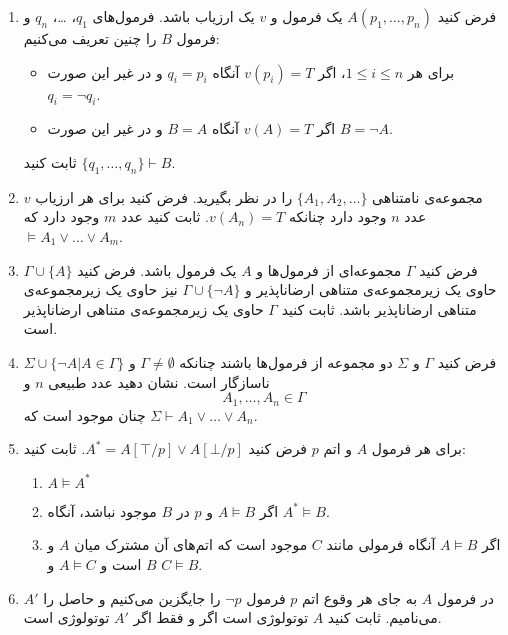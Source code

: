 \documentclass[12pt, 14paper]{article}
\begin{document}
\begin{enumerate}
\item
فرض کنید
$A(p_1,\ldots,p_n)$
یک فرمول و $v$ یک ارزیاب باشد. فرمول‌های $q_1$، \ldots، $q_n$ و فرمول $B$ را چنین تعریف می‌کنیم:
\begin{itemize}[label={--}]
\item
برای هر $1\leq i\leq n$، اگر $v(p_i)=T$ آنگاه $q_i=p_i$ و در غیر این صورت $q_i=\neg q_i$.

\item
اگر $v(A)=T$ آنگاه $B=A$ و در غیر این صورت $B=\neg A$.
\end{itemize}
ثابت کنید
$\{q_1,\ldots,q_n\}\vdash B$.

\item
مجموعه‌ی نامتناهی
$\{A_1,A_2,\ldots\}$
را در نظر بگیرید. فرض کنید برای هر ارزیاب $v$ عدد $n$ وجود دارد چنانکه $v(A_n)=T$. ثابت کنید عدد $m$ وجود دارد که
$\models A_1\vee\ldots\vee A_m$.

\item
فرض کنید $\Gamma$ مجموعه‌ای از فرمول‌ها و $A$ یک فرمول باشد. فرض کنید $\Gamma\cup \{A\}$ حاوی یک زیرمجموعه‌ی متناهی ارضاناپذیر و $\Gamma\cup\{\neg A\}$ نیز حاوی یک زیرمجموعه‌ی متناهی ارضاناپذیر باشد. ثابت کنید $\Gamma$ حاوی یک زیرمجموعه‌ی متناهی ارضاناپذیر است.

\item
فرض کنید $\Gamma$ و $\Sigma$ دو مجموعه از فرمول‌ها باشند چنانکه $\Gamma\neq\emptyset$ و
$\Sigma\cup\{\neg A|A\in\Gamma\}$
ناسازگار است. نشان دهید عدد طبیعی $n$ و
$$
A_1,\ldots,A_n\in\Gamma
$$
چنان موجود است که
$\Sigma\vdash A_1\vee\ldots\vee A_n$.

\item
برای هر فرمول $A$ و اتم $p$ فرض کنید
$A^*=A[\top/p]\vee A[\bot/p]$.
ثابت کنید:
\begin{enumerate}
\item
$A\models A^*$
\item
اگر
$A\models B$
و $p$ در $B$ موجود نباشد، آنگاه
$A^*\models B$.
\item
اگر
$A\models B$
آنگاه فرمولی مانند $C$ موجود است که اتم‌های آن مشترک میان $A$ و $B$ است و $A\models C$ و $C\models B$.
\end{enumerate}

\item
در فرمول $A$ به جای هر وقوع اتم $p$ فرمول $\neg p$ را جایگزین می‌کنیم و حاصل را $A'$ می‌نامیم. ثابت کنید $A$ توتولوژی است اگر و فقط اگر $A'$ توتولوژی است.

\end{enumerate}
\end{document}
